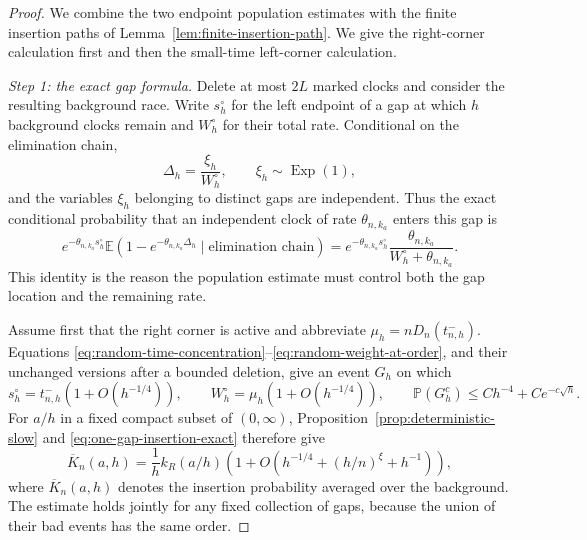\documentclass[11pt]{article}
\theoremstyle{remark}
\theoremstyle{plain}
\newcommand{\E}{\mathbb E}
\newcommand{\Pp}{\mathbb P}
\begin{document}
\begin{proof}
We combine the two endpoint population estimates with the finite insertion
paths of Lemma~\ref{lem:finite-insertion-path}.  We give the right-corner
calculation first and then the small-time left-corner calculation.

\smallskip
\noindent\emph{Step 1: the exact gap formula.}
Delete at most $2L$ marked clocks and consider the resulting background
race.  Write $s_h^\circ$ for the left endpoint of a gap at which $h$
background clocks remain and $W_h^\circ$ for their total rate.  Conditional
on the elimination chain,
\begin{equation}\label{eq:tail-gap-exact}
 \Delta_h=\frac{\xi_h}{W_h^\circ},
 \qquad \xi_h\sim\operatorname{Exp}(1),
\end{equation}
and the variables $\xi_h$ belonging to distinct gaps are independent.  Thus
the exact conditional probability that an independent clock of rate
$\theta_{n,k_a}$ enters this gap is
\begin{equation}\label{eq:one-gap-insertion-exact}
 e^{-\theta_{n,k_a}s_h^\circ}
 \E\left(1-e^{-\theta_{n,k_a}\Delta_h}
          \mid\text{elimination chain}\right)
 =e^{-\theta_{n,k_a}s_h^\circ}
   \frac{\theta_{n,k_a}}{W_h^\circ+\theta_{n,k_a}}.
\end{equation}
This identity is the reason the population estimate must control both the
gap location and the remaining rate.

Assume first that the right corner is active and abbreviate
$\mu_h=nD_n(t_{n,h}^-)$.  Equations
\eqref{eq:random-time-concentration}--\eqref{eq:random-weight-at-order}, and
their unchanged versions after a bounded deletion, give an event $G_h$ on
which
\begin{equation}\label{eq:path-population-good}
 s_h^\circ=t_{n,h}^-(1+O(h^{-1/4})),\qquad
 W_h^\circ=\mu_h(1+O(h^{-1/4})),
 \qquad
 \Pp(G_h^c)\le Ch^{-4}+Ce^{-c\sqrt h}.
\end{equation}
For $a/h$ in a fixed compact subset of $(0,\infty)$,
Proposition~\ref{prop:deterministic-slow} and
\eqref{eq:one-gap-insertion-exact} therefore give
\begin{equation}\label{eq:discrete-tail-kernel}
 \overline K_n(a,h)
 =\frac1h k_R(a/h)
 \left(1+O(h^{-1/4}+(h/n)^\xi+h^{-1})\right),
\end{equation}
where $\overline K_n(a,h)$ denotes the insertion probability averaged over
the background.  The estimate holds jointly for any fixed collection of
gaps, because the union of their bad events has the same order.


\end{proof}
\end{document}
